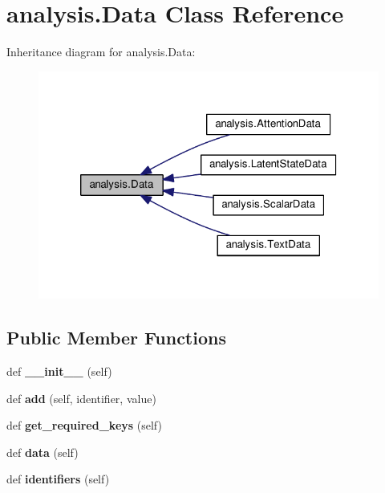 \hypertarget{classanalysis_1_1Data}{}\section{analysis.\+Data Class Reference}
\label{classanalysis_1_1Data}


Inheritance diagram for analysis.\+Data\+:
\nopagebreak
\begin{figure}[H]
\begin{center}
\leavevmode
\includegraphics[width=320pt]{classanalysis_1_1Data__inherit__graph}
\end{center}
\end{figure}
\subsection*{Public Member Functions}
\begin{DoxyCompactItemize}
\item 
def {\bfseries \+\_\+\+\_\+init\+\_\+\+\_\+} (self)\hypertarget{classanalysis_1_1Data_a421f903716bc94060deced05ef0be1c4}{}\label{classanalysis_1_1Data_a421f903716bc94060deced05ef0be1c4}

\item 
def {\bfseries add} (self, identifier, value)\hypertarget{classanalysis_1_1Data_a270c5134554c0fcb878c19aa13698489}{}\label{classanalysis_1_1Data_a270c5134554c0fcb878c19aa13698489}

\item 
def {\bfseries get\+\_\+required\+\_\+keys} (self)\hypertarget{classanalysis_1_1Data_ab0735d062f6ad56c2b136ab31068680b}{}\label{classanalysis_1_1Data_ab0735d062f6ad56c2b136ab31068680b}

\item 
def {\bfseries data} (self)\hypertarget{classanalysis_1_1Data_a4d47ba14ef2cef870bdee36aaa0c6f5b}{}\label{classanalysis_1_1Data_a4d47ba14ef2cef870bdee36aaa0c6f5b}

\item 
def {\bfseries identifiers} (self)\hypertarget{classanalysis_1_1Data_ae25a08a00858c9f8f998f1b53320e6ef}{}\label{classanalysis_1_1Data_ae25a08a00858c9f8f998f1b53320e6ef}

\end{DoxyCompactItemize}


